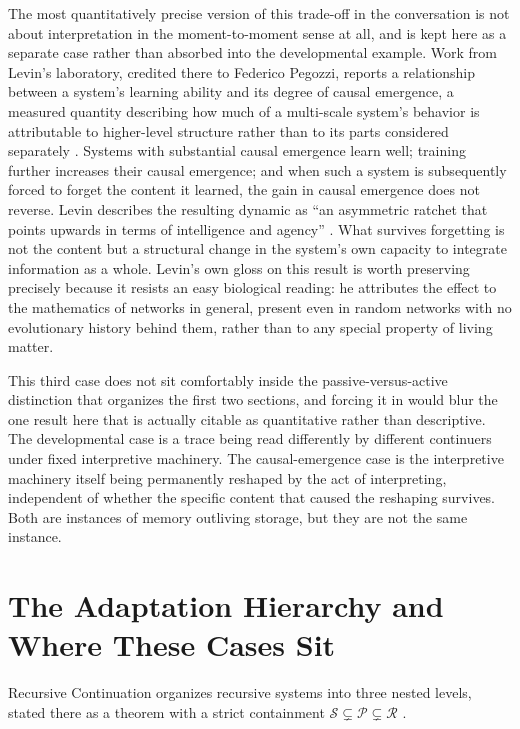 \documentclass[11pt]{article}
\begin{document}
The most quantitatively precise version of this trade-off in the conversation is not about interpretation in the moment-to-moment sense at all, and is kept here as a separate case rather than absorbed into the developmental example. Work from Levin's laboratory, credited there to Federico Pegozzi, reports a relationship between a system's learning ability and its degree of causal emergence, a measured quantity describing how much of a multi-scale system's behavior is attributable to higher-level structure rather than to its parts considered separately \cite{levinschleisman2026, pegozzi}. Systems with substantial causal emergence learn well; training further increases their causal emergence; and when such a system is subsequently forced to forget the content it learned, the gain in causal emergence does not reverse. Levin describes the resulting dynamic as ``an asymmetric ratchet that points upwards in terms of intelligence and agency'' \cite{levinschleisman2026}. What survives forgetting is not the content but a structural change in the system's own capacity to integrate information as a whole. Levin's own gloss on this result is worth preserving precisely because it resists an easy biological reading: he attributes the effect to the mathematics of networks in general, present even in random networks with no evolutionary history behind them, rather than to any special property of living matter.

This third case does not sit comfortably inside the passive-versus-active distinction that organizes the first two sections, and forcing it in would blur the one result here that is actually citable as quantitative rather than descriptive. The developmental case is a trace being read differently by different continuers under fixed interpretive machinery. The causal-emergence case is the interpretive machinery itself being permanently reshaped by the act of interpreting, independent of whether the specific content that caused the reshaping survives. Both are instances of memory outliving storage, but they are not the same instance.

\section{The Adaptation Hierarchy and Where These Cases Sit}

Recursive Continuation organizes recursive systems into three nested levels, stated there as a theorem with a strict containment $\mathcal{S} \subsetneq \mathcal{P} \subsetneq \mathcal{R}$ \cite{recursivecontinuation}.
\end{document}
